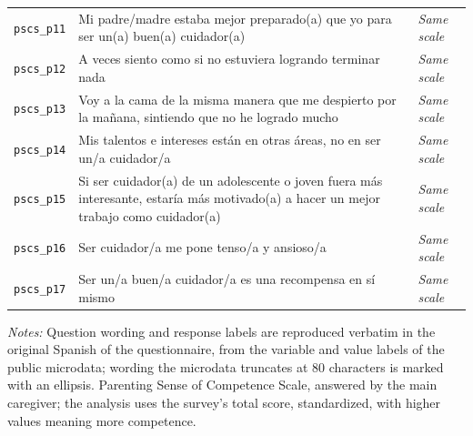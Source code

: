 \begin{table}[htbp]
\begin{threeparttable}
\begin{tabular}{@{}p{68pt}p{212pt}p{150pt}@{}}
\addlinespace[1pt]
\texttt{pscs\_p11} & Mi padre/madre estaba mejor preparado(a) que yo para ser un(a) buen(a) cuidador(a) & \textit{Same scale} \\
\addlinespace[1pt]
\texttt{pscs\_p12} & A veces siento como si no estuviera logrando terminar nada & \textit{Same scale} \\
\addlinespace[1pt]
\texttt{pscs\_p13} & Voy a la cama de la misma manera que me despierto por la mañana, sintiendo que no he logrado mucho & \textit{Same scale} \\
\addlinespace[1pt]
\texttt{pscs\_p14} & Mis talentos e intereses están en otras áreas, no en ser un/a cuidador/a & \textit{Same scale} \\
\addlinespace[1pt]
\texttt{pscs\_p15} & Si ser cuidador(a) de un adolescente o joven fuera más interesante, estaría más motivado(a) a hacer un mejor trabajo como cuidador(a) & \textit{Same scale} \\
\addlinespace[1pt]
\texttt{pscs\_p16} & Ser cuidador/a me pone tenso/a y ansioso/a & \textit{Same scale} \\
\addlinespace[1pt]
\texttt{pscs\_p17} & Ser un/a buen/a cuidador/a es una recompensa en sí mismo & \textit{Same scale} \\
\bottomrule
\end{tabular}
\begin{wpnotes}
\textit{Notes:} Question wording and response labels are reproduced verbatim in the original Spanish of the questionnaire, from the variable and value labels of the public microdata; wording the microdata truncates at 80 characters is marked with an ellipsis. Parenting Sense of Competence Scale, answered by the main caregiver; the analysis uses the survey's total score, standardized, with higher values meaning more competence.
\end{wpnotes}
\end{threeparttable}
\end{table}
